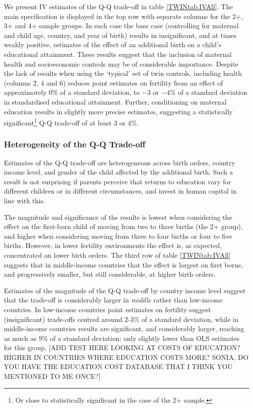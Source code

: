 We present IV estimates of the Q-Q trade-off in table \ref{TWINtab:IVAll}.  The 
main specification is displayed in the top row with separate columns for the 2+, 
3+ and 4+ sample groups.  In each case the base case (controlling for maternal 
and child age, country, and year of birth) results in insignificant, and at times 
weakly positive, estimates of the effect of an additional birth on a child's
educational attainment.  These results suggest that the inclusion of maternal 
health and socioeconomic controls may be of considerable importance.  Despite
the lack of results when using the `typical' set of twin controls, including 
health (columns 2, 4 and 6) reduces point estimates on fertility from an effect
of approximately 0\% of a standard deviation, to $-3$ or $-4$\% of a standard 
deviation in standardised educational attainment.  Further, conditioning on
maternal education results in slightly more precise estimates, suggesting a
statistically significant\footnote{Or close to statistically significant in the 
case of the 2+ sample.} Q-Q trade-off of at least 3 or 4\%.

\subsubsection{Heterogeneity of the Q-Q Trade-off}
Estimates of the Q-Q trade-off are heterogeneous across birth orders, country 
income level, and gender of the child affected by the additional birth.  Such a 
result is not surprising if parents perceive that returns to education vary for 
different children or in different circumstances, and invest in human capital in 
line with this.  

The magnitude and significance of the results is lowest when considering the 
effect on the first-born child of moving from two to three births (the 2+ group), 
and higher when considering moving from three to four births or four to five 
births.  However, in lower fertility environments the effect is, as expected, 
concentrated on lower birth orders. The third row of table \ref{TWINtab:IVAll} 
suggests that in middle-income countries that the effect is largest on first 
borns, and progressively smaller, but still considerable, at higher birth orders.

Estimates of the magnitude of the Q-Q trade-off by country income level suggest
that the trade-off is considerably larger in \emph{middle} rather than low-income
countries.  In low-income countries point estimates on fertility suggest 
(insignificant) trade-offs centred around 2-3\% of a standard deviation, while 
in middle-income countries results are significant, and considerably larger,
reaching as much as 9\% of a standard deviation: only slightly lower than OLS
estimates for this group. [ADD TEST HERE LOOKING AT COSTS OF EDUCATION?  HIGHER
IN COUNTRIES WHERE EDUCATION COSTS MORE? SONIA, DO YOU HAVE THE EDUCATION COST 
DATABASE THAT I THINK YOU MENTIONED TO ME ONCE?]

